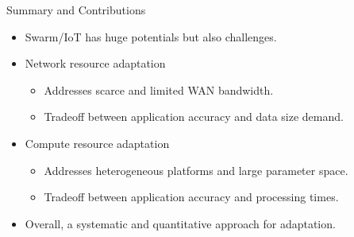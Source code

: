 \begin{frame}{Summary and Contributions}
  \begin{itemize}
  \item Swarm/IoT has huge potentials but also challenges.
  \item Network resource adaptation
    \begin{itemize}
    \item Addresses scarce and limited WAN bandwidth.
    \item Tradeoff between application accuracy and data size demand.
    \end{itemize}
  \item Compute resource adaptation
    \begin{itemize}
    \item Addresses heterogeneous platforms and large parameter space.
    \item Tradeoff between application accuracy and processing times.
    \end{itemize}
  \item Overall, a systematic and quantitative approach for adaptation.
  \end{itemize}
\end{frame}

